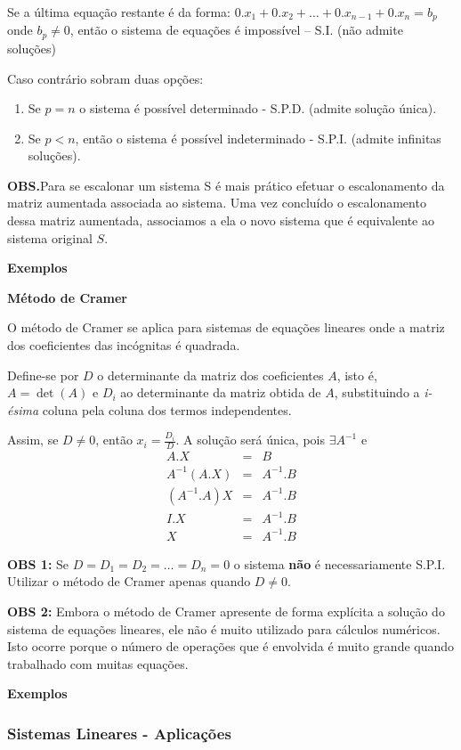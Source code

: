 \documentclass[oneside,a4paper,12pt]{article}
\begin{document}
Se a última equação restante é da forma: $0.x_1+0.x_2+\dots+0.x_{n-1}+0.x_n = b_p$ onde $b_p \neq 0$, então o sistema de equações é impossível – S.I. (não admite soluções)

Caso contrário sobram duas opções:
\begin{enumerate}
	\item Se $p=n$ o sistema é possível determinado - S.P.D. (admite solução única).
	\item Se $p<n$, então o sistema é possível indeterminado - S.P.I. (admite infinitas soluções).
\end{enumerate}

\textbf{OBS.}Para se escalonar um sistema S é mais prático efetuar o escalonamento da matriz aumentada associada ao sistema. Uma vez concluído o escalonamento dessa matriz aumentada, associamos a ela o novo sistema que é equivalente ao sistema original $S$.

\textbf{Exemplos}

\textbf{Método de Cramer}

O método de Cramer se aplica para sistemas de equações lineares onde a matriz dos coeficientes das incógnitas é quadrada.

Define-se por $D$ o determinante da matriz dos coeficientes $A$, isto é, $A = \det(A)$ e $D_i$ ao determinante da matriz obtida de $A$, substituindo a {\it i-ésima} coluna pela coluna dos termos independentes.

Assim, se $D \neq 0$, então $x_i = \frac{D_i}{D}$. A solução será única, pois $\exists A^{-1}$ e
\begin{eqnarray*}
A.X &=& B \\
A^{-1}(A.X) &=&A^{-1}.B \\
(A^{-1}.A)X &=&A^{-1}.B \\
I.X &=& A^{-1}.B \\
X &=& A^{-1}.B
\end{eqnarray*}
	
\textbf{OBS 1:} Se $D=D_1=D_2=\dots=D_n=0$ o sistema {\bf não} é necessariamente S.P.I. Utilizar o método de Cramer apenas quando $D \neq 0$.

\textbf{OBS 2:} Embora o método de Cramer apresente de forma explícita a solução do sistema de equações lineares, ele não é muito utilizado para cálculos numéricos. Isto ocorre porque o número de operações que é envolvida é muito grande quando trabalhado com muitas equações.

\textbf{Exemplos}

\subsubsection{Sistemas Lineares - Aplicações}
\end{document}
